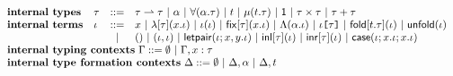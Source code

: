 $\begin{array}{llcl}%
\textbf{internal types} & \ity & ::= & \multicolumn{1}{l}{\iparr{\ity}{\ity} ~|~ \alpha ~|~ \iforall{\alpha}{\ity} ~|~ t ~|~ \imu{t}{\ity} ~|~ \iunit ~|~ \iprod{\ity}{\ity} ~|~ \isum{\ity}{\ity}}\\
\textbf{internal terms} & \itm & ::= & \multicolumn{1}{l}{x ~|~ \ilam{\ity}{x}{\itm} ~|~ \iap{\itm}{\itm} ~|~ \ifix{\ity}{x}{\itm} ~|~ \iLam{\alpha}{\itm} ~|~ \iAp{\ity}{\itm} ~|~ \ifold{t}{\ity}{\itm} ~|~ \iunfold{\itm} }\\
&& ~|~ & \multicolumn{1}{l}{\itriv ~|~ \ipair{\itm}{\itm} ~|~ \iletpair{\itm}{x}{y}{\itm} ~|~ \iinl{\ity}{\itm} ~|~ \iinr{\ity}{\itm} ~|~ \icase{\itm}{x}{\itm}{x}{\itm}}\\
\multicolumn{4}{l}{\textbf{internal typing contexts}~\Gamma ::= \emptyset ~|~ \Gamma, x : \tau}\\
\multicolumn{4}{l}{\textbf{internal type formation contexts}~\Delta ::= \emptyset ~|~ \Delta, \alpha ~|~ \Delta, t}\\
\end{array}%
$